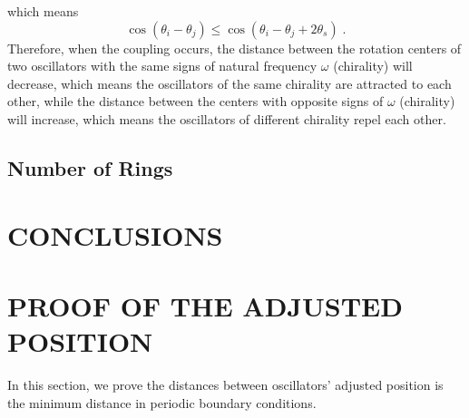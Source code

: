 \documentclass[%
 aip,
 amsmath,amssymb,
 reprint,%
]{revtex4-1}
\begin{document}
which means
\begin{equation}
    \cos \left( \theta _i-\theta _j \right) \leqslant \cos \left( \theta _i-\theta _j+2\theta _s \right)\;.
\end{equation}
Therefore, when the coupling occurs, the distance between the rotation centers of two oscillators with the same signs of natural frequency $\omega$ (chirality) will decrease, which means the oscillators of the same chirality are attracted to each other, while the distance between the centers with opposite signs of $\omega$ (chirality) will increase, which means the oscillators of different chirality repel each other.

\subsection{Number of Rings \label{sec:numRings}}

\section{\label{sec:conclusions}CONCLUSIONS}

\appendix

\section{\label{sec:adj_pos} PROOF OF THE ADJUSTED POSITION}

In this section, we prove the distances between oscillators' adjusted position is the minimum distance in periodic boundary conditions. 
\end{document}
